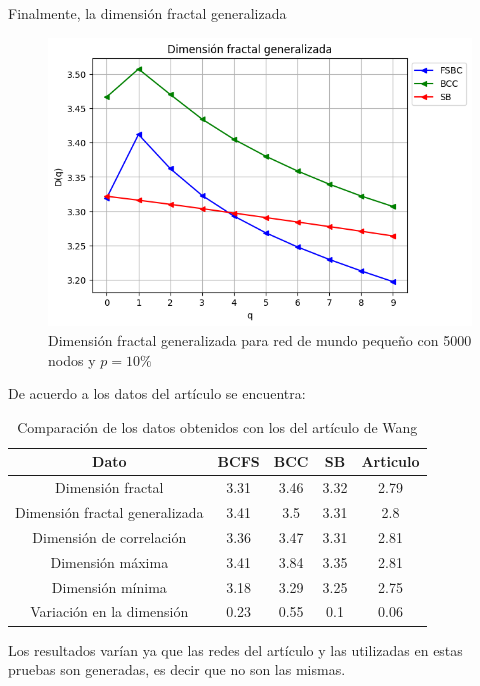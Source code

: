 Finalmente, la dimensión fractal generalizada
\begin{figure}[H]
    \centering
    \includegraphics[scale=0.7]{Capitulo4Multifractalidad/imagenes/a_DqsmallWorld4000p10.png}
    \caption{Dimensión fractal generalizada para red de mundo pequeño con 5000 nodos y $p=10\%$}
\end{figure}

De acuerdo a los datos del artículo se encuentra:
\begin{table}[H]
    \centering
    \begin{tabular}{|c|c|c|c|c|}
        \hline
         \textbf{Dato}& \textbf{BCFS} & \textbf{BCC} & \textbf{SB} & \textbf{Articulo} \\
         \hline
         Dimensión fractal &3.31 & 3.46 & 3.32 & 2.79 \\
         \hline
         Dimensión fractal generalizada & 3.41 & 3.5 & 3.31 &2.8  \\
         \hline
         Dimensión de correlación & 3.36 & 3.47 & 3.31 &2.81 \\
         \hline
         Dimensión máxima & 3.41 & 3.84 & 3.35 &2.81 \\
         \hline
         Dimensión mínima & 3.18 & 3.29 & 3.25 &2.75 \\
         \hline
         Variación en la dimensión & 0.23 & 0.55 & 0.1 &0.06 \\
         \hline
    \end{tabular}
    \caption{Comparación de los datos obtenidos con los del artículo de Wang\cite{Wang2012}}
\end{table}

Los resultados varían ya que las redes del artículo y las utilizadas en estas pruebas son generadas, es decir que no son las mismas.

